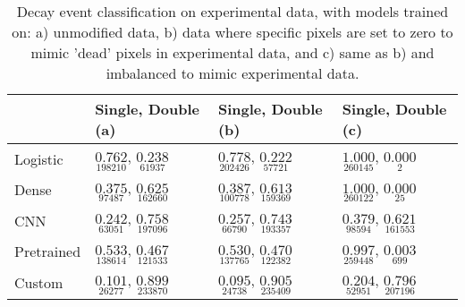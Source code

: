 \begin{table}
\centering
\caption{
Decay event classification on experimental data, with models trained on:
a) unmodified data, b) data where specific pixels are set to zero to mimic
'dead' pixels in experimental data, and c) same as b) and imbalanced to mimic experimental data.
}
\label{tab:classification-experimental-ratios}
\begin{tabular}{llll}
\toprule
{} &                                                                              Single, Double (a) &                                                                              Single, Double (b) &                                                                             Single, Double (c) \\
\midrule
Logistic   &  $\underset{\num{ 198210 }  }{\num{ 0.762 } }$,   $\underset{\num{ 61937 }  }{\num{ 0.238 } }$ &  $\underset{\num{ 202426 }  }{\num{ 0.778 } }$,   $\underset{\num{ 57721 }  }{\num{ 0.222 } }$ &  $\underset{\num{ 260145 }  }{\num{ 1.000 } }$,   $\underset{\num{ 2 }  }{\num{ 0.000 } }$ \\
Dense      &  $\underset{\num{ 97487 }  }{\num{ 0.375 } }$,   $\underset{\num{ 162660 }  }{\num{ 0.625 } }$ &  $\underset{\num{ 100778 }  }{\num{ 0.387 } }$,   $\underset{\num{ 159369 }  }{\num{ 0.613 } }$ &  $\underset{\num{ 260122 }  }{\num{ 1.000 } }$,   $\underset{\num{ 25 }  }{\num{ 0.000 } }$ \\
CNN        &  $\underset{\num{ 63051 }  }{\num{ 0.242 } }$,   $\underset{\num{ 197096 }  }{\num{ 0.758 } }$ &  $\underset{\num{ 66790 }  }{\num{ 0.257 } }$,   $\underset{\num{ 193357 }  }{\num{ 0.743 } }$ &  $\underset{\num{ 98594 }  }{\num{ 0.379 } }$,   $\underset{\num{ 161553 }  }{\num{ 0.621 } }$ \\
Pretrained &  $\underset{\num{ 138614 }  }{\num{ 0.533 } }$,   $\underset{\num{ 121533 }  }{\num{ 0.467 } }$ &  $\underset{\num{ 137765 }  }{\num{ 0.530 } }$,   $\underset{\num{ 122382 }  }{\num{ 0.470 } }$ &  $\underset{\num{ 259448 }  }{\num{ 0.997 } }$,   $\underset{\num{ 699 }  }{\num{ 0.003 } }$ \\
Custom     &  $\underset{\num{ 26277 }  }{\num{ 0.101 } }$,   $\underset{\num{ 233870 }  }{\num{ 0.899 } }$ &  $\underset{\num{ 24738 }  }{\num{ 0.095 } }$,   $\underset{\num{ 235409 }  }{\num{ 0.905 } }$ &  $\underset{\num{ 52951 }  }{\num{ 0.204 } }$,   $\underset{\num{ 207196 }  }{\num{ 0.796 } }$ \\
\bottomrule
\end{tabular}
\end{table}
